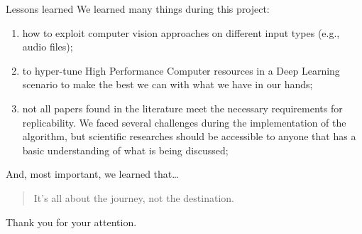 	\begin{frame}[allowframebreaks]{Lessons learned}
	We learned many things during this project:
	\begin{enumerate}
		\item how to exploit computer vision approaches on different input types (e.g., audio files);
		\item to hyper-tune High Performance Computer resources in a Deep Learning scenario to make the best we can with what we have in our hands;
		\item not all papers found in the literature meet the necessary requirements for replicability. We faced several challenges during the implementation of the algorithm, but scientific researches should be accessible to anyone that has a basic understanding of what is being discussed;
	\end{enumerate}
	
	\framebreak
	
	And, most important, we learned that\dots
		
	\begin{quote}
    	It's all about the journey, not the destination.
    \end{quote}
	Thank you for your attention.
     
	\end{frame}